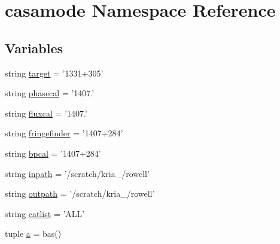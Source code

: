 \hypertarget{namespacecasamode}{\section{casamode \-Namespace \-Reference}
\label{namespacecasamode}
}
\subsection*{\-Variables}
\begin{DoxyCompactItemize}
\item 
string \hyperlink{namespacecasamode_a14694f46bf2d61abd8fc20ef37d54a71}{target} = '1331+305'
\item 
string \hyperlink{namespacecasamode_aecc7de8e7c1db024c5c8d843ecd56927}{phasecal} = '1407.'
\item 
string \hyperlink{namespacecasamode_af407f6ad8015416bde1e3a2d4cca9306}{fluxcal} = '1407.'
\item 
string \hyperlink{namespacecasamode_a92dfbda1cee2c2f465ed8ce489e61994}{fringefinder} = '1407+284'
\item 
string \hyperlink{namespacecasamode_aa02b11b4029c791ae4409d257259fe66}{bpcal} = '1407+284'
\item 
string \hyperlink{namespacecasamode_aecdb6c4b0173d8c6ddaa53340133ac89}{inpath} = '/scratch/kria\-\_/rowell'
\item 
string \hyperlink{namespacecasamode_a4f350c4e696fcd2e2d45a5f6c9cfafb0}{outpath} = '/scratch/kria\-\_/rowell'
\item 
string \hyperlink{namespacecasamode_a302834304f815a0efb70313a0a59f5bb}{catlist} = '\-A\-L\-L'
\item 
tuple \hyperlink{namespacecasamode_af8ef63e76629367e4608c45582024fb5}{a} = bas()
\end{DoxyCompactItemize}


